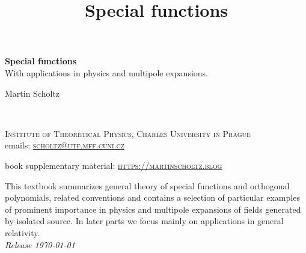 \documentclass[11pt,fleqn]{book} %
\begin{document}
\title{Special functions}


\begingroup
\thispagestyle{empty}
\centering
\vspace*{5cm}
\par\normalfont\fontsize{35}{35}\sffamily\selectfont
\textbf{Special functions}\\
{\LARGE With applications in physics and multipole expansions.}\par %
\vspace*{1cm}
{\Huge Martin Scholtz}\par %
\endgroup


\newpage
~\vfill
\thispagestyle{empty}


\noindent \textsc{Institute of Theoretical Physics, Charles University in Prague}\\

\noindent emails: \href{mailto:scholtz@utf.mff.cuni.cz}{\textsc{scholtz@utf.mff.cuni.cz}}\ %

\vspace{1cm}

\noindent book supplementary material: \href{http://martinscholtz.blog}{\textsc{https://martinscholtz.blog}}

\vspace{1cm}

\noindent This textbook summarizes general theory of special functions and orthogonal polynomials, related conventions and contains a selection of particular examples of prominent importance in physics and multipole expansions of fields generated by isolated source. In later parts we focus mainly on applications in general relativity.\\ %

\noindent \textit{Release \today} %
\end{document}

